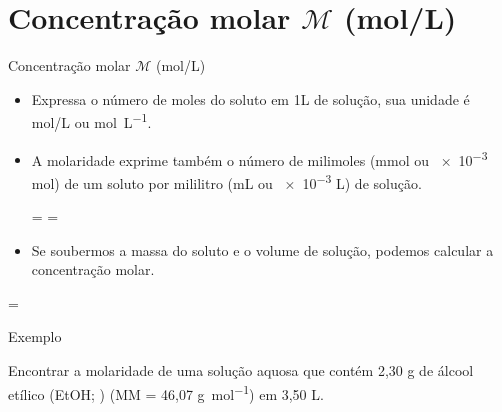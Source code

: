 \documentclass[presentation,professionalfonts,aspectratio=169]{beamer}
\begin{document}
\section{Concentração molar \(\mathcal{M}\) (mol/L)}
\label{sec:org69253a1}

\begin{frame}[label={sec:org992c6d6}]{Concentração molar \(\mathcal{M}\) (mol/L)}
\begin{itemize}
\item Expressa o número de moles do soluto em 1L de solução, sua unidade é \alert{mol/L} ou \alert{\unit{\mole\per\liter}}.
\item A molaridade exprime também o número de milimoles (mmol ou \num{e-3} mol) de um soluto por mililitro (mL ou \num{e-3} L) de solução.

\begin{tcolorbox}
= \Longrightarrow {}=
\end{tcolorbox}

\item Se soubermos a massa do soluto e o volume de solução, podemos calcular a concentração molar.
\end{itemize}

\begin{tcolorbox}
=
\end{tcolorbox}
\end{frame}

\begin{frame}[label={sec:orge768519}]{Exemplo}
\begin{question}
Encontrar a molaridade de uma solução aquosa que contém 2,30 g de álcool
etílico (EtOH; ) (MM = 46,07 \unit{\gram\per\mole}) em 3,50 L.
\end{question}

\end{frame}
\end{document}
